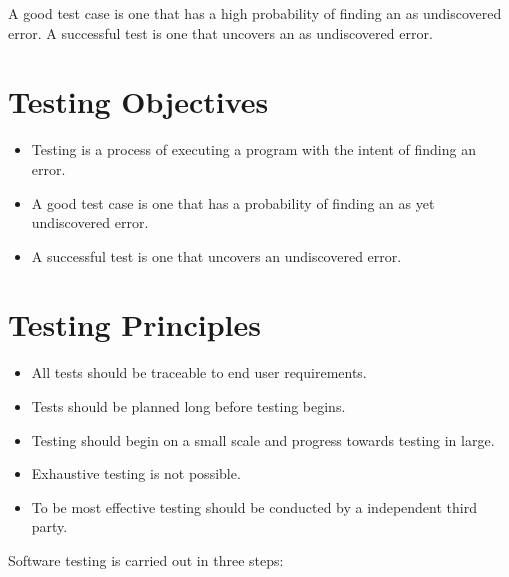 \documentclass[12pt,a4 paper]{report}
\begin{document}
A good test case is one that has a high probability of finding an as undiscovered error. A successful test is one that uncovers an as undiscovered error. \\

\section{Testing Objectives}
\begin{itemize} 
\item Testing is a process of executing a program with the intent of finding an error. 
\item A good test case is one that has a probability of finding an as yet undiscovered error. 
\item A successful test is one that uncovers an undiscovered error.
\end{itemize}

\section{Testing Principles}
\begin{itemize} 
\item All tests should be traceable to end user requirements.
\item Tests should be planned long before testing begins.
\item Testing should begin on a small scale and progress towards testing in large.
\item Exhaustive testing is not possible.
\item To be most effective testing should be conducted by a independent third party.
\end{itemize}

\noindent Software testing is carried out in three steps: 
\end{document}

